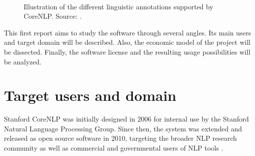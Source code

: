 \documentclass{classeENS}
\begin{document}
\begin{figure}[H] 
    \center
    \quad
    \\
    \quad
    \caption{Illustration of the different linguistic annotations supported by CoreNLP. Source: \cite{CoreNLP}.}
    \label{fig:annotation examples}
\end{figure}


This first report aims to study the software through several angles. Its main users and target domain will be described. Also, the economic model of the project will be dissected. Finally, the software license and the resulting usage possibilities will be analyzed. 

\section{Target users and domain}\label{sec:target}

Stanford CoreNLP was initially designed in 2006 for internal use by the Stanford Natural Language Processing Group. Since then, the system was extended and released as open source software in 2010, targeting the broader NLP research community as well as commercial and governmental users of NLP tools \cite{ToolkitPaper}.
\end{document}
